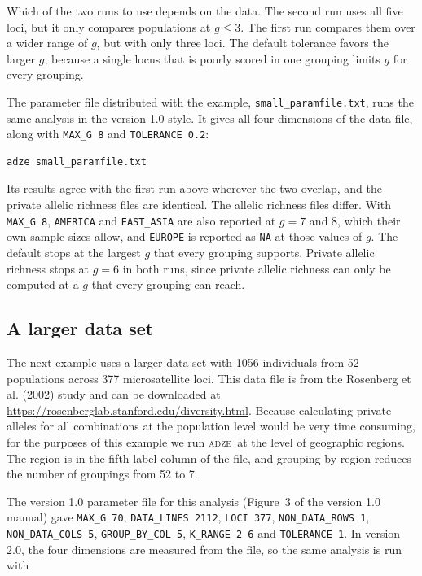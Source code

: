 \documentclass[11pt]{article}
\newcommand{\prog}{\textsc{adze}}
\begin{document}
Which of the two runs to use depends on the data. The second run uses all five
loci, but it only compares populations at $g \leq 3$. The first run compares
them over a wider range of $g$, but with only three loci. The default
tolerance favors the larger $g$, because a single locus that is poorly scored
in one grouping limits $g$ for every grouping.

The parameter file distributed with the example, \texttt{small\_paramfile.txt},
runs the same analysis in the version 1.0 style. It gives all four dimensions
of the data file, along with \texttt{MAX\_G 8} and \texttt{TOLERANCE 0.2}:
\begin{Verbatim}[xleftmargin=1em]
adze small_paramfile.txt
\end{Verbatim}
\noindent Its results agree with the first run above wherever the two
overlap, and the private allelic richness files are identical. The allelic
richness files differ. With \texttt{MAX\_G 8}, \texttt{AMERICA} and
\texttt{EAST\_ASIA} are also reported at $g = 7$ and $8$, which their own sample
sizes allow, and \texttt{EUROPE} is reported as \texttt{NA} at those values of
$g$. The default stops at the largest $g$ that every grouping supports.
Private allelic richness stops at $g = 6$ in both runs, since private allelic
richness can only be computed at a $g$ that every grouping can reach.

\subsection{A larger data set}

The next example uses a larger data set with 1056 individuals from 52
populations across 377 microsatellite loci. This data file is from the
Rosenberg et al. (2002) study and can be downloaded at
\url{https://rosenberglab.stanford.edu/diversity.html}. Because calculating
private alleles for all combinations at the population level would be very
time consuming, for the purposes of this example we run \prog\ at the level of
geographic regions. The region is in the fifth label column of the file, and
grouping by region reduces the number of groupings from 52 to 7.

The version 1.0 parameter file for this analysis (Figure~3 of the version 1.0
manual) gave \texttt{MAX\_G 70}, \texttt{DATA\_LINES 2112},
\texttt{LOCI 377}, \texttt{NON\_DATA\_ROWS 1}, \texttt{NON\_DATA\_COLS 5},
\texttt{GROUP\_BY\_COL 5}, \texttt{K\_RANGE 2-6} and \texttt{TOLERANCE 1}. In
version 2.0, the four dimensions are measured from the file, so the same
analysis is run with
\end{document}
